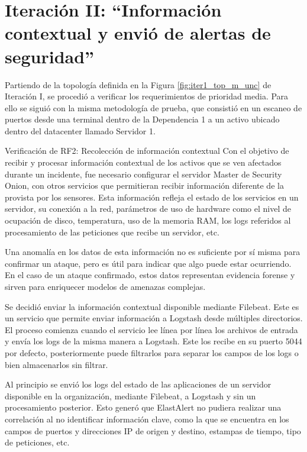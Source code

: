 \chapter{\Large Iteración II: “Información contextual y envió de alertas de seguridad”}
\label{iteracion2}
    Partiendo de la topología definida en la Figura \ref{fig:iter1_top_m_unc} de Iteración I, se procedió a verificar los requerimientos de prioridad media. Para ello se siguió con la misma metodología de prueba, que consistió en un escaneo de puertos desde una terminal dentro de la Dependencia 1 a un activo ubicado dentro del datacenter llamado Servidor 1.
    \begin{section}{Verificación de RF2: Recolección de información contextual}
    Con el objetivo de recibir y procesar información contextual de los activos que se ven afectados durante un incidente, fue necesario configurar el servidor Master de Security Onion, con otros servicios que permitieran recibir información diferente de la provista por los sensores. Esta información refleja el estado de los servicios en un servidor, su conexión a la red, parámetros de uso de hardware como el nivel de ocupación de disco, temperatura, uso de la memoria RAM, los logs referidos al procesamiento de las peticiones que recibe un servidor, etc. \par
     Una anomalía en los datos de esta información no es suficiente por sí misma para confirmar un ataque, pero es útil para indicar que algo puede estar ocurriendo. En el caso de un ataque confirmado, estos datos representan evidencia forense y sirven para enriquecer modelos de amenazas complejas. \par
     Se decidió enviar la información contextual disponible mediante Filebeat. Este es un servicio que permite enviar información a Logstash desde múltiples directorios. El proceso comienza cuando el servicio lee línea por línea los archivos de entrada y envía los logs de la misma manera a Logstash. Este los recibe en su puerto 5044 por defecto, posteriormente puede filtrarlos para separar los campos de los logs o bien almacenarlos sin filtrar. \par
     Al principio se envió los logs del estado de las aplicaciones de un servidor disponible en la organización, mediante Filebeat, a Logstash y sin un procesamiento posterior. Esto generó que ElastAlert no pudiera realizar una correlación al no identificar información clave, como la que se encuentra en los campos de puertos y direcciones IP de origen y destino, estampas de tiempo, tipo de peticiones, etc.\par

\end{section}
